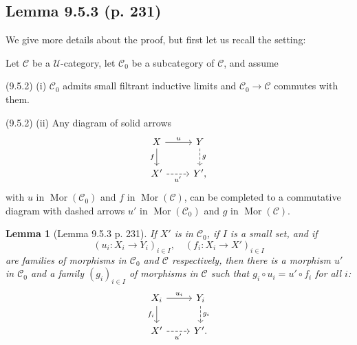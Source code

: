 \documentclass[12pt]{article}
\newtheorem{lem}[thm]{Lemma}
\theoremstyle{remark}
\theoremstyle{definition}
\newcommand{\nn}{\noindent}
\newcommand{\C}{\mathcal C}
\newcommand{\U}{\mathcal U}
\DeclareMathOperator{\Mor}{Mor}
\begin{document}

\subsection{Lemma 9.5.3 (p. 231)}

We give more details about the proof, but first let us recall the setting:

Let $\C$ be a $\U$-category, let $\C_0$ be a subcategory of $\C$, and assume 

\nn(9.5.2) (i) $\C_0$ admits small filtrant inductive limits and $\C_0\to\C$ commutes with them.

\nn(9.5.2) (ii) Any diagram of solid arrows
%
\begin{equation}\label{952ii}
\begin{tikzcd}
X\ar{d}[swap]{f}\ar{r}{u}&Y\ar[dashed]{d}{g}\\ 
X'\ar[dashed]{r}[swap]{u'}&Y',
\end{tikzcd}
\end{equation}
%
with $u$ in $\Mor(\C_0)$ and $f$ in $\Mor(\C)$, can be completed to a commutative diagram with dashed arrows $u'$ in $\Mor(\C_0)$ and $g$ in $\Mor(\C)$.

\begin{lem}[Lemma 9.5.3 p. 231]
If $X'$ is in $\C_0$, if $I$ is a small set, and if  
$$
(u_i:X_i\to Y_i)_{i\in I},\quad(f_i:X_i\to X')_{i\in I}
$$ 
are families of morphisms in $\C_0$ and $\C$ respectively, then there is a morphism $u'$ in $\C_0$ and a family $(g_i)_{i\in I}$ of morphisms in $\C$ such that $g_i\circ u_i=u'\circ f_i$ for all $i$:
$$
\begin{tikzcd}
X_i\ar{d}[swap]{f_i}\ar{r}{u_i}&Y_i\ar[dashed]{d}{g_i}\\ 
X'\ar[dashed]{r}[swap]{u'}&Y'.
\end{tikzcd}
$$ 
\end{lem}
\end{document}
